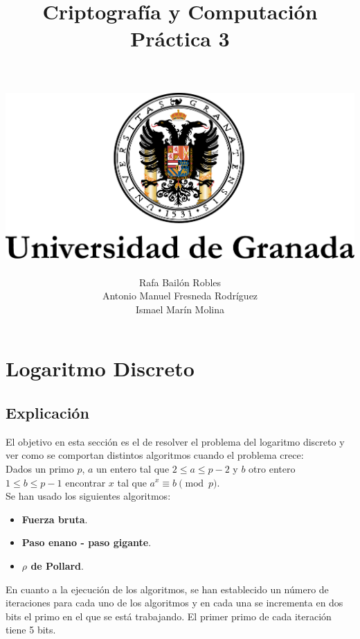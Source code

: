 \documentclass[12pt,spanish]{article}
\author{
		\\\\
		\includegraphics[scale=1]{UGR} \\
		\linebreak\\
		\Large Rafa Bailón Robles\\
		\Large Antonio Manuel Fresneda Rodríguez\\
		\Large Ismael Marín Molina\\
	}
\title{\huge \textbf{Criptografía y Computación\\ Práctica 3}}
\begin{document}
        \maketitle
        \pagebreak
        \tableofcontents
        \pagebreak
 	\section{Logaritmo Discreto}
	\subsection{Explicación}
	 	El objetivo en esta sección es el de resolver el problema del logaritmo discreto y ver como se comportan distintos algoritmos cuando el problema crece:\\
	 	Dados un primo $p$, $a$ un entero tal que $2 \leq a \leq p-2$ y $b$ otro entero $1 \leq b \leq p-1$ encontrar $x$ tal que $a^{x} \equiv b \pmod{p}$.\\
	 	Se han usado los siguientes algoritmos: 
	 	\begin{itemize}
	 		\item\textbf{Fuerza bruta}.
	 		\item\textbf{Paso enano - paso gigante}.
	 		\item\textbf{\boldmath $\rho$ de Pollard}.
	 	\end{itemize}
		En cuanto a la ejecución de los algoritmos, se han establecido un número de iteraciones para cada uno de los algoritmos y en cada una se incrementa en dos bits el primo en el que se está trabajando. El primer primo de cada iteración tiene 5 bits.
		\pagebreak
\end{document}
